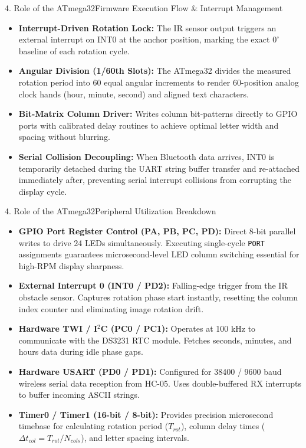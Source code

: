 \documentclass[aspectratio=169, 10pt]{beamer}
\begin{document}
\begin{frame}{4. Role of the ATmega32}{Firmware Execution Flow \& Interrupt Management}
    \vspace{0.08cm}
    \begin{itemize}
        \footnotesize
        \item \textbf{Interrupt-Driven Rotation Lock:} The IR sensor output triggers an external interrupt on INT0 at the anchor position, marking the exact $0^\circ$ baseline of each rotation cycle.
        \item \textbf{Angular Division (1/60th Slots):} The ATmega32 divides the measured rotation period into 60 equal angular increments to render 60-position analog clock hands (hour, minute, second) and aligned text characters.
        \item \textbf{Bit-Matrix Column Driver:} Writes column bit-patterns directly to GPIO ports with calibrated delay routines to achieve optimal letter width and spacing without blurring.
        \item \textbf{Serial Collision Decoupling:} When Bluetooth data arrives, INT0 is temporarily detached during the UART string buffer transfer and re-attached immediately after, preventing serial interrupt collisions from corrupting the display cycle.
    \end{itemize}
\end{frame}

\begin{frame}{4. Role of the ATmega32}{Peripheral Utilization Breakdown}
    \footnotesize
    \begin{itemize}
        \item \textbf{GPIO Port Register Control (PA, PB, PC, PD):} Direct 8-bit parallel writes to drive 24 LEDs simultaneously. Executing single-cycle \texttt{PORT} assignments guarantees microsecond-level LED column switching essential for high-RPM display sharpness.
        \item \textbf{External Interrupt 0 (INT0 / PD2):} Falling-edge trigger from the IR obstacle sensor. Captures rotation phase start instantly, resetting the column index counter and eliminating image rotation drift.
        \item \textbf{Hardware TWI / I$^2$C (PC0 / PC1):} Operates at 100 kHz to communicate with the DS3231 RTC module. Fetches seconds, minutes, and hours data during idle phase gaps.
        \item \textbf{Hardware USART (PD0 / PD1):} Configured for 38400 / 9600 baud wireless serial data reception from HC-05. Uses double-buffered RX interrupts to buffer incoming ASCII strings.
        \item \textbf{Timer0 / Timer1 (16-bit / 8-bit):} Provides precision microsecond timebase for calculating rotation period ($T_{rot}$), column delay times ($\Delta t_{col} = T_{rot} / N_{cols}$), and letter spacing intervals.
    \end{itemize}
\end{frame}
\end{document}
